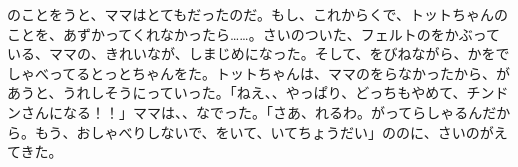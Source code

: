 のことをうと、ママはとてもだったのだ。もし、これからくで、トットちゃんのことを、あずかってくれなかったら……。さいのついた、フェルトのをかぶっている、ママの、きれいなが、しまじめになった。そして、をびねながら、かをでしゃべってるとっとちゃんをた。トットちゃんは、ママのをらなかったから、があうと、うれしそうにっていった。「ねえ、、やっぱり、どっちもやめて、チンドンさんになる！！」ママは、、なでった。「さあ、れるわ。がってらしゃるんだから。もう、おしゃべりしないで、をいて、いてちょうだい」ののに、さいのがえてきた。



